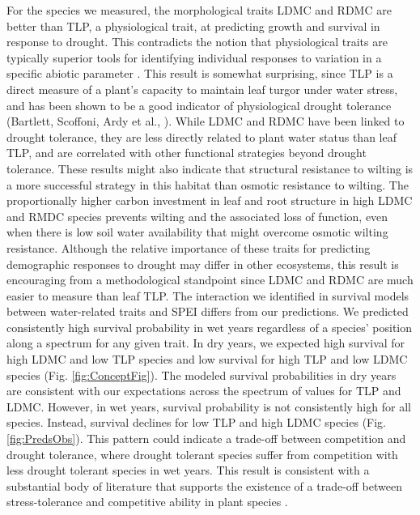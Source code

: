 \documentclass[12pt, letterpaper]{article}
\begin{document}
For the species we measured, the morphological traits LDMC and RDMC are better than TLP, a physiological trait, at predicting growth and survival in response to drought. This contradicts the notion that physiological traits are typically superior tools for identifying individual responses to variation in a specific abiotic parameter \cite{Volaire2018}. This result is somewhat surprising, since TLP is a direct measure of a plant's capacity to maintain leaf turgor under water stress, and has been shown to be a good indicator of physiological drought tolerance (Bartlett, Scoffoni, Ardy et al., ). While LDMC and RDMC have been linked to drought tolerance, they are less directly related to plant water status than leaf TLP, and are correlated with other functional strategies beyond drought tolerance. These results might also indicate that structural resistance to wilting is a more successful strategy in this habitat than osmotic resistance to wilting. The proportionally higher carbon investment in leaf and root structure in high LDMC and RMDC species prevents wilting and the associated loss of function, even when there is low soil water availability that might overcome osmotic wilting resistance. Although the relative importance of these traits for predicting demographic responses to drought may differ in other ecosystems, this result is encouraging from a methodological standpoint since LDMC and RDMC are much easier to measure than leaf TLP.
The interaction we identified in survival models between water-related traits and SPEI differs from our predictions. We predicted consistently high survival probability in wet years regardless of a species’ position along a spectrum for any given trait. In dry years, we expected high survival for high LDMC and low TLP species and low survival for high TLP and low LDMC species (Fig. \ref{fig:ConceptFig}). The modeled survival probabilities in dry years are consistent with our expectations across the spectrum of values for TLP and LDMC. However, in wet years, survival probability is not consistently high for all species. Instead, survival declines for low TLP and high LDMC species (Fig. \ref{fig:PredsObs}). This pattern could indicate a trade-off between competition and drought tolerance, where drought tolerant species suffer from competition with less drought tolerant species in wet years. This result is consistent with a substantial body of literature that supports the existence of a trade-off between stress-tolerance and competitive ability in plant species \cite{Grime1979, Grime1997, Craine2007, Volaire2018}.
\end{document}
